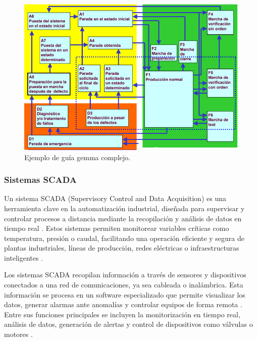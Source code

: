 \begin{figure} [h!]
  \begin{center}
    \includegraphics[width=15cm]{figs/guia_gemma}
  \end{center}
  \caption{\centering Ejemplo de guía gemma complejo. \cite{guia_gemma}}
  \label{fig:guia_gemma}
\end{figure} 

\subsubsection{Sistemas SCADA}

Un sistema SCADA (Supervisory Control and Data Acquisition) es una herramienta clave en la automatización industrial, diseñada para supervisar y controlar procesos a distancia mediante la recopilación y análisis de datos en tiempo real \cite{scada}. Estos sistemas permiten monitorear variables críticas como temperatura, presión o caudal, facilitando una operación eficiente y segura de plantas industriales, líneas de producción, redes eléctricas o infraestructuras inteligentes \cite{scada}.

Los sistemas SCADA recopilan información a través de sensores y dispositivos conectados a una red de comunicaciones, ya sea cableada o inalámbrica. Esta información se procesa en un software especializado que permite visualizar los datos, generar alarmas ante anomalías y controlar equipos de forma remota \cite{scada}. Entre sus funciones principales se incluyen la monitorización en tiempo real, análisis de datos, generación de alertas y control de dispositivos como válvulas o motores \cite{scada}.

